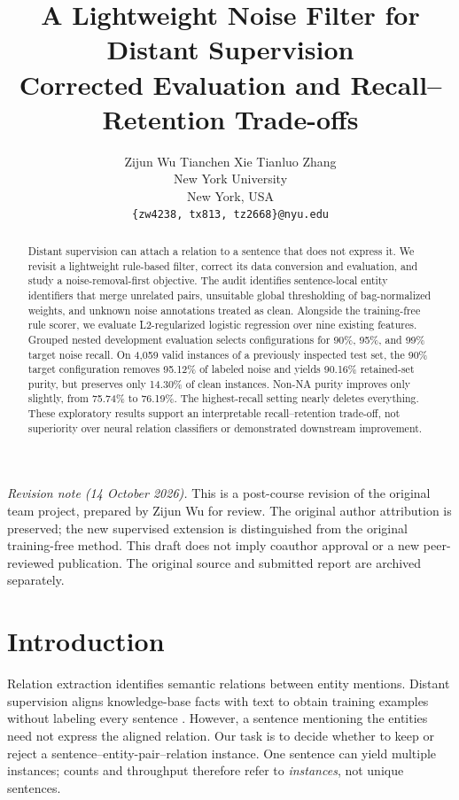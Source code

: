 \documentclass[11pt]{article}
\title{A Lightweight Noise Filter for Distant Supervision\\
\large Corrected Evaluation and Recall--Retention Trade-offs}
\author{
   Zijun Wu \quad Tianchen Xie \quad Tianluo Zhang\\
  New York University\\
  New York, USA \\
  \texttt{\{zw4238, tx813, tz2668\}@nyu.edu}
}
\begin{document}
\maketitle
\begin{abstract}
Distant supervision can attach a relation to a sentence that does not express it. We revisit a lightweight rule-based filter, correct its data conversion and evaluation, and study a noise-removal-first objective. The audit identifies sentence-local entity identifiers that merge unrelated pairs, unsuitable global thresholding of bag-normalized weights, and unknown noise annotations treated as clean. Alongside the training-free rule scorer, we evaluate L2-regularized logistic regression over nine existing features. Grouped nested development evaluation selects configurations for 90\%, 95\%, and 99\% target noise recall. On 4,059 valid instances of a previously inspected test set, the 90\% target configuration removes 95.12\% of labeled noise and yields 90.16\% retained-set purity, but preserves only 14.30\% of clean instances. Non-NA purity improves only slightly, from 75.74\% to 76.19\%. The highest-recall setting nearly deletes everything. These exploratory results support an interpretable recall--retention trade-off, not superiority over neural relation classifiers or demonstrated downstream improvement.
\end{abstract}

\noindent\textit{Revision note (14 October 2026).} This is a post-course revision of the original team project, prepared by Zijun Wu for review. The original author attribution is preserved; the new supervised extension is distinguished from the original training-free method. This draft does not imply coauthor approval or a new peer-reviewed publication. The original source and submitted report are archived separately.

\section{Introduction}
Relation extraction identifies semantic relations between entity mentions. Distant supervision aligns knowledge-base facts with text to obtain training examples without labeling every sentence \citep{mintz-etal-2009-distant}. However, a sentence mentioning the entities need not express the aligned relation. Our task is to decide whether to keep or reject a sentence--entity-pair--relation instance. One sentence can yield multiple instances; counts and throughput therefore refer to \emph{instances}, not unique sentences.
\end{document}
